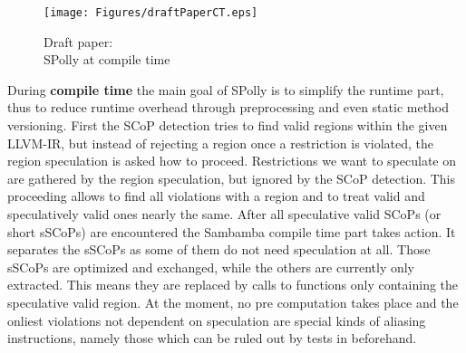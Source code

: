 \begin{figure}
  \centering
  \texttt{[image: Figures/draftPaperCT.eps]}
  \caption{Draft paper: \\SPolly at compile time}
  \vspace*{-5mm}
  \label{fig:draftPaperCT}  
\end{figure}
During \textbf{compile time} the main goal of SPolly is to simplify the runtime part,
thus to reduce runtime overhead through preprocessing and even static method versioning.
First the SCoP detection tries to find valid regions within the given LLVM-IR, 
but instead of rejecting a region once a restriction is violated, 
the region speculation is asked how to proceed. Restrictions we want to speculate
on are gathered by the region speculation, but ignored by the SCoP detection.
This proceeding allows to find all violations with a region and to treat valid and
speculatively valid ones nearly the same. After all  
speculative valid SCoPs (or short sSCoPs) are encountered the Sambamba compile 
time part takes action. It separates the sSCoPs as some of them do not need
speculation at all. Those sSCoPs are optimized and exchanged, 
while the others are currently only extracted. This means they are replaced by
calls to functions only containing the speculative valid region. 
At the moment, no pre computation takes place and the onliest violations 
not dependent on speculation are special kinds of aliasing instructions, 
namely those which can be ruled out by tests in beforehand. 




